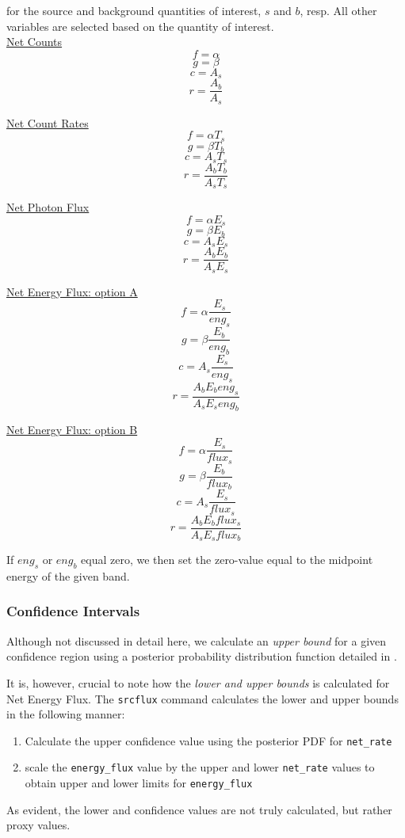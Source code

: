 \documentclass[11pt,letterpaper]{article}
\begin{document}
for the source and background quantities of interest, $s$ and $b$, resp. All other variables are selected based on the quantity of interest.\\
\underline{Net Counts}
$$f = \alpha $$
$$g = \beta $$
$$c = A_s$$
$$r = \frac{A_b}{A_s}$$

\underline{Net Count Rates}
$$f = \alpha T_s$$
$$g = \beta T_b$$
$$c = A_s T_s$$
$$r = \frac{A_bT_b}{A_sT_s}$$

\underline{Net Photon Flux}
$$f = \alpha E_s$$
$$g = \beta E_b$$
$$c = A_s E_s$$
$$r = \frac{A_bE_b}{A_sE_s}$$

\underline{Net Energy Flux: option A}
$$f = \alpha \frac{E_s}{eng_s}$$
$$g = \beta  \frac{E_b}{eng_b}$$
$$c = A_s  \frac{E_s}{eng_s}$$
$$r = \frac{A_bE_beng_s}{A_sE_seng_b}$$

\underline{Net Energy Flux: option B}
$$f = \alpha \frac{E_s}{flux_s}$$
$$g = \beta  \frac{E_b}{flux_b}$$
$$c = A_s  \frac{E_s}{flux_s}$$
$$r = \frac{A_bE_bflux_s}{A_sE_sflux_b}$$

If $eng_s$ or $eng_b$ equal zero, we then set the zero-value equal to the midpoint energy of the given band.
\subsubsection{Confidence Intervals}
Although not discussed in detail here, we calculate an \textit{upper bound} for a given confidence region using a posterior probability distribution function detailed in \cite{Kashyap}.

It is, however, crucial to note how the \textit{lower and upper bounds} is calculated for Net Energy Flux. The \texttt{srcflux} command calculates the lower and upper bounds in the following manner: 
\begin{enumerate}
	\item Calculate the upper confidence value using the posterior PDF for \texttt{net\_rate}
	\item scale the \texttt{energy\_flux} value by the upper and lower \texttt{net\_rate} values to obtain upper and lower limits for \texttt{energy\_flux}  
\end{enumerate}

As evident, the lower and confidence values are not truly calculated, but rather proxy values.
\end{document}
